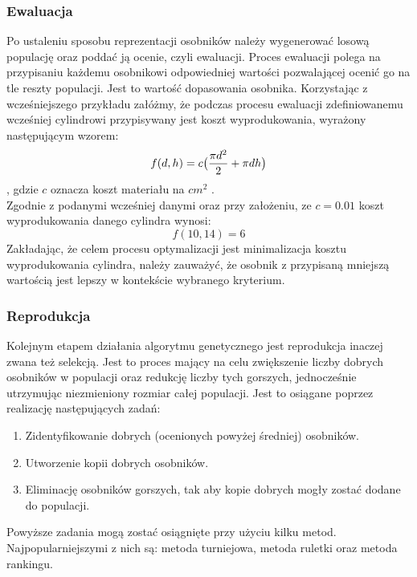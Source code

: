\documentclass[twoside]{iisthesis}
\begin{document}
\subsubsection{Ewaluacja}
Po ustaleniu sposobu reprezentacji osobników należy wygenerować losową populację oraz poddać ją ocenie, czyli ewaluacji. Proces ewaluacji polega na przypisaniu każdemu osobnikowi odpowiedniej wartości pozwalającej ocenić go na tle reszty populacji. Jest to wartość dopasowania osobnika. Korzystając z wcześniejszego przykładu załóżmy, że podczas procesu ewaluacji zdefiniowanemu wcześniej cylindrowi przypisywany jest koszt wyprodukowania, wyrażony następującym wzorem:
\begin{equation}
f(d,h) = c\big{(}\dfrac{\pi d^{2}}{2} + \pi dh\big{)}
\end{equation}
, gdzie $c$ oznacza koszt materiału na $cm^{2}$ \cite{book}.\\
Zgodnie z podanymi wcześniej danymi oraz przy założeniu, ze $c = 0.01$ koszt wyprodukowania danego cylindra wynosi:
\[f(10, 14) = 6\]
Zakładając, że celem procesu optymalizacji jest minimalizacja kosztu wyprodukowania cylindra, należy zauważyć, że osobnik z przypisaną mniejszą wartością jest lepszy w kontekście wybranego kryterium.
\subsubsection{Reprodukcja}
Kolejnym etapem działania algorytmu genetycznego jest reprodukcja inaczej zwana też selekcją. Jest to proces mający na celu zwiększenie liczby dobrych osobników w populacji oraz redukcję liczby tych gorszych, jednocześnie utrzymując niezmieniony rozmiar całej populacji. Jest to osiągane poprzez realizację następujących zadań:\\
\begin{enumerate}
	\item Zidentyfikowanie dobrych (ocenionych powyżej średniej) osobników.
	\item Utworzenie kopii dobrych osobników.
	\item Eliminację osobników gorszych, tak aby kopie dobrych mogły zostać dodane do populacji.\cite{book}\\
\end{enumerate}
Powyższe zadania mogą zostać osiągnięte przy użyciu kilku metod. Najpopularniejszymi z nich są: metoda turniejowa, metoda ruletki oraz metoda rankingu.
\end{document}
